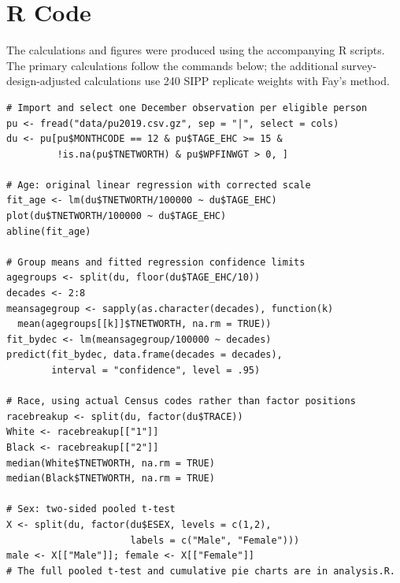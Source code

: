 \documentclass[11pt]{article}
\begin{document}
\section*{R Code}
The calculations and figures were produced using the accompanying R scripts. The primary calculations follow the commands below; the additional survey-design-adjusted calculations use 240 SIPP replicate weights with Fay's method.
\begin{Verbatim}[fontsize=\scriptsize,breaklines=true]
# Import and select one December observation per eligible person
pu <- fread("data/pu2019.csv.gz", sep = "|", select = cols)
du <- pu[pu$MONTHCODE == 12 & pu$TAGE_EHC >= 15 &
         !is.na(pu$TNETWORTH) & pu$WPFINWGT > 0, ]

# Age: original linear regression with corrected scale
fit_age <- lm(du$TNETWORTH/100000 ~ du$TAGE_EHC)
plot(du$TNETWORTH/100000 ~ du$TAGE_EHC)
abline(fit_age)

# Group means and fitted regression confidence limits
agegroups <- split(du, floor(du$TAGE_EHC/10))
decades <- 2:8
meansagegroup <- sapply(as.character(decades), function(k)
  mean(agegroups[[k]]$TNETWORTH, na.rm = TRUE))
fit_bydec <- lm(meansagegroup/100000 ~ decades)
predict(fit_bydec, data.frame(decades = decades),
        interval = "confidence", level = .95)

# Race, using actual Census codes rather than factor positions
racebreakup <- split(du, factor(du$TRACE))
White <- racebreakup[["1"]]
Black <- racebreakup[["2"]]
median(White$TNETWORTH, na.rm = TRUE)
median(Black$TNETWORTH, na.rm = TRUE)

# Sex: two-sided pooled t-test
X <- split(du, factor(du$ESEX, levels = c(1,2),
                      labels = c("Male", "Female")))
male <- X[["Male"]]; female <- X[["Female"]]
# The full pooled t-test and cumulative pie charts are in analysis.R.
\end{Verbatim}
\end{document}

